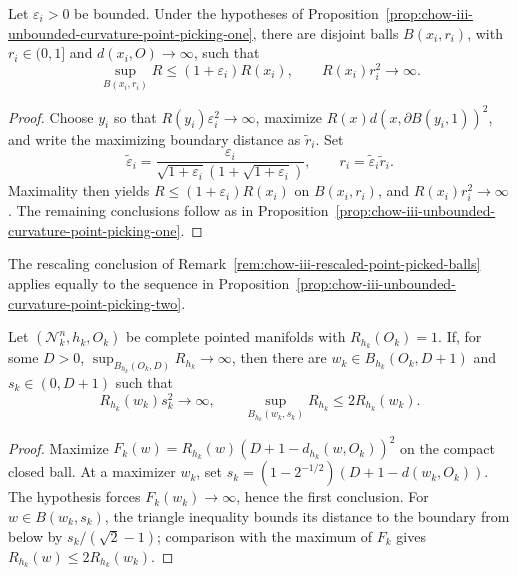 \begin{proposition}
\label{prop:chow-iii-unbounded-curvature-point-picking-two}
Let \(\varepsilon_i>0\) be bounded.  Under the hypotheses of
Proposition~\ref{prop:chow-iii-unbounded-curvature-point-picking-one}, there
are disjoint balls \(B(x_i,r_i)\), with \(r_i\in(0,1]\) and
\(d(x_i,O)\to\infty\), such that
\[
 \sup_{B(x_i,r_i)}R\le(1+\varepsilon_i)R(x_i),
 \qquad R(x_i)r_i^2\to\infty.
\]
\end{proposition}
\begin{proof}
\sketch Choose \(y_i\) so that \(R(y_i)\varepsilon_i^2\to\infty\), maximize
\(R(x)d(x,\partial B(y_i,1))^2\), and write the maximizing boundary distance
as \(\widetilde r_i\).  Set
\[
 \widetilde\varepsilon_i=
 \frac{\varepsilon_i}{\sqrt{1+\varepsilon_i}(1+\sqrt{1+\varepsilon_i})},
 \qquad r_i=\widetilde\varepsilon_i\widetilde r_i.
\]
Maximality then yields \(R\le(1+\varepsilon_i)R(x_i)\) on \(B(x_i,r_i)\),
and \(R(x_i)r_i^2\to\infty\).  The remaining conclusions follow as in
Proposition~\ref{prop:chow-iii-unbounded-curvature-point-picking-one}.
\end{proof}

\begin{remark}
\label{rem:chow-iii-improved-point-picking-rescaling}
The rescaling conclusion of
Remark~\ref{rem:chow-iii-rescaled-point-picked-balls} applies equally to the
sequence in Proposition~\ref{prop:chow-iii-unbounded-curvature-point-picking-two}.
\end{remark}

\begin{lemma}
\label{lem:chow-iii-point-picking-unbounded-change}
Let \((\mathcal N_k^n,h_k,O_k)\) be complete pointed manifolds with
\(R_{h_k}(O_k)=1\).  If, for some \(D>0\),
\(\sup_{B_{h_k}(O_k,D)}R_{h_k}\to\infty\), then there are
\(w_k\in B_{h_k}(O_k,D+1)\) and \(s_k\in(0,D+1)\) such that
\[
 R_{h_k}(w_k)s_k^2\to\infty,
 \qquad \sup_{B_{h_k}(w_k,s_k)}R_{h_k}\le2R_{h_k}(w_k).
\]
\end{lemma}
\begin{proof}
\sketch Maximize
\(F_k(w)=R_{h_k}(w)(D+1-d_{h_k}(w,O_k))^2\) on the compact closed ball.
At a maximizer \(w_k\), set
\(s_k=(1-2^{-1/2})(D+1-d(w_k,O_k))\).  The hypothesis forces
\(F_k(w_k)\to\infty\), hence the first conclusion.  For
\(w\in B(w_k,s_k)\), the triangle inequality bounds its distance to the
boundary from below by \(s_k/(\sqrt2-1)\); comparison with the maximum of
\(F_k\) gives \(R_{h_k}(w)\le2R_{h_k}(w_k)\).
\end{proof}

